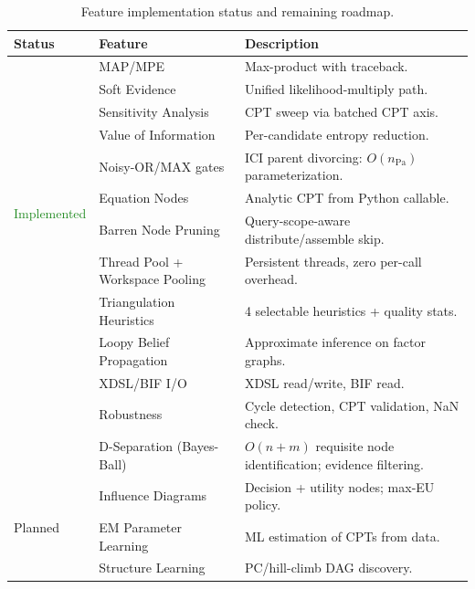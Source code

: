 \documentclass[11pt, letterpaper]{article}
\newcommand{\Pa}{\mathrm{Pa}}
\theoremstyle{definitionstyle}
\begin{document}
\begin{table}[ht]
\centering
\caption{Feature implementation status and remaining roadmap.}
\label{tab:roadmap}
\begin{tabular}{llp{6.8cm}}
\toprule
\textbf{Status} & \textbf{Feature} & \textbf{Description} \\
\midrule
\multirow{10}{*}{\textcolor{ForestGreen}{Implemented}} & MAP/MPE & Max-product with traceback. \\
                           & Soft Evidence & Unified likelihood-multiply path. \\
                           & Sensitivity Analysis & CPT sweep via batched CPT axis. \\
                           & Value of Information & Per-candidate entropy reduction. \\
                           & Noisy-OR/MAX gates & ICI parent divorcing: $O(n_{\Pa})$ parameterization. \\
                           & Equation Nodes     & Analytic CPT from Python callable. \\
                           & Barren Node Pruning & Query-scope-aware distribute/assemble skip. \\
                           & Thread Pool + Workspace Pooling & Persistent threads, zero per-call overhead. \\
                           & Triangulation Heuristics & 4 selectable heuristics + quality stats. \\
                           & Loopy Belief Propagation & Approximate inference on factor graphs. \\
                           & XDSL/BIF I/O & XDSL read/write, BIF read. \\
                           & Robustness & Cycle detection, CPT validation, NaN check. \\
\midrule
                           & D-Separation (Bayes-Ball)  & $O(n{+}m)$ requisite node identification; evidence filtering. \\
\midrule
\multirow{3}{*}{Planned} & Influence Diagrams & Decision + utility nodes; max-EU policy. \\
                         & EM Parameter Learning & ML estimation of CPTs from data. \\
                         & Structure Learning    & PC/hill-climb DAG discovery. \\
\bottomrule
\end{tabular}
\end{table}
\end{document}
